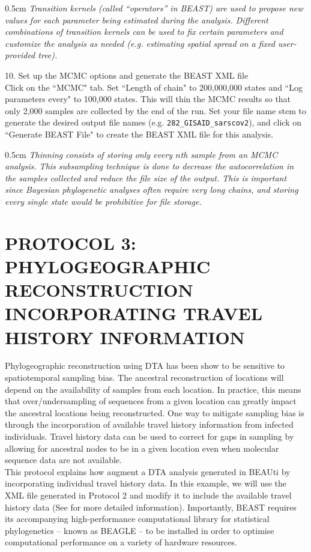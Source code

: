 \documentclass{article}
\newcommand{\ann}[1]{
\begin{adjustwidth}{0.5cm}{}
\it{#1}\\
\end{adjustwidth}}
\begin{document}
\ann{Transition kernels (called ``operators'' in BEAST) are used to propose new values for each parameter being estimated during the analysis.
Different combinations of transition kernels can be used to fix certain parameters and customize the analysis as needed (e.g. estimating spatial spread on a fixed user-provided tree).}

10. Set up the MCMC options and generate the BEAST XML file\\

Click on the ``MCMC" tab. Set ``Length of chain" to 200,000,000 states and ``Log parameters every" to 100,000 states.
This will thin the MCMC results so that only 2,000 samples are collected by the end of the run.
Set your file name stem to generate the desired output file names (e.g. \texttt{282\_GISAID\_sarscov2}), and click on ``Generate BEAST File" to create the BEAST XML file for this analysis.\\

\ann{Thinning consists of storing only every $n$th sample from an MCMC analysis. This subsampling technique is done to decrease the autocorrelation in the samples collected and reduce the file size of the output. This is important since Bayesian phylogenetic analyses often require very long chains, and storing every single state would be prohibitive for file storage.}

\section*{PROTOCOL 3: PHYLOGEOGRAPHIC RECONSTRUCTION INCORPORATING TRAVEL HISTORY INFORMATION}

Phylogeographic reconstruction using DTA has been show to be sensitive to spatiotemporal sampling bias. The ancestral reconstruction of locations will depend on the availability of samples from each location. In practice, this means that over/undersampling of sequences from a given location can greatly impact the ancestral locations being reconstructed. One way to mitigate sampling bias is through the incorporation of available travel history information from infected individuals. Travel history data can be used to correct for gaps in sampling by allowing for ancestral nodes to be in a given location even when molecular sequence data are not available.\\

This protocol explains how augment a DTA analysis generated in BEAUti by incorporating individual travel history data.
In this example, we will use the XML file generated in Protocol 2 and modify it to include the available travel history data (See \cite{travhist} for more detailed information).
Importantly, BEAST requires its accompanying high-performance computational library for statistical phylogenetics -- known as BEAGLE \cite{beagle3} -- %
to be installed in order to optimise computational performance on a variety of hardware resources.
\end{document}
